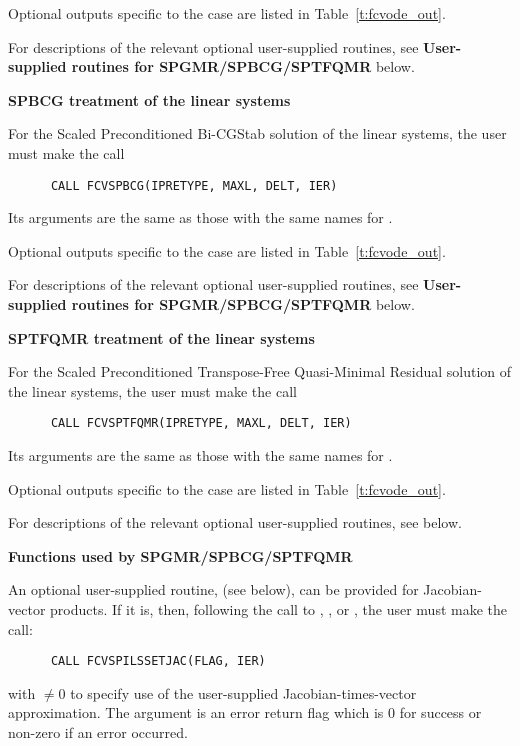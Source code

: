 \begin{Steps}
  Optional outputs specific to the {\spgmr} case are listed in
  Table~\ref{t:fcvode_out}.

  For descriptions of the relevant optional user-supplied routines, see 
  {\bf User-supplied routines for SPGMR/SPBCG/SPTFQMR} below.
  
  
  {\s}{\p} {\bf SPBCG treatment of the linear systems}
  
  For the Scaled Preconditioned Bi-CGStab solution of the linear systems,
  the user must make the call
\begin{verbatim}
      CALL FCVSPBCG(IPRETYPE, MAXL, DELT, IER)
\end{verbatim}
  Its arguments are the same as those with the same names for .

  Optional outputs specific to the {\spbcg} case are listed in
  Table~\ref{t:fcvode_out}.

  For descriptions of the relevant optional user-supplied routines, see 
  {\bf User-supplied routines for SPGMR/SPBCG/SPTFQMR} below.
  
  
  {\s}{\p} {\bf SPTFQMR treatment of the linear systems}
  
  For the Scaled Preconditioned Transpose-Free Quasi-Minimal Residual solution 
  of the linear systems, the user must make the call
\begin{verbatim}
      CALL FCVSPTFQMR(IPRETYPE, MAXL, DELT, IER)
\end{verbatim}
  Its arguments are the same as those with the same names for .

  Optional outputs specific to the {\sptfqmr} case are listed in
  Table~\ref{t:fcvode_out}.

  For descriptions of the relevant optional user-supplied routines, see below.
  

  {\s}{\p} {\bf Functions used by SPGMR/SPBCG/SPTFQMR}

  An optional user-supplied routine,  (see below), can be provided for
  Jacobian-vector products.  If it is, then, following the call to
  , , or , the user must make the call:
\begin{verbatim}
      CALL FCVSPILSSETJAC(FLAG, IER)
\end{verbatim}
  with  $\neq 0$ to specify use of the user-supplied
  Jacobian-times-vector approximation.
  The argument  is an error return flag which is $0$ 
  for success or non-zero if an error occurred.
  

\end{Steps}
